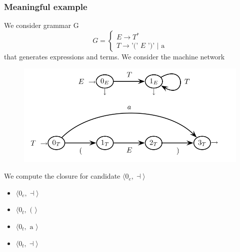 			\subsubsection{Meaningful example}
				We consider grammar G
				\begin{equation}
					G = 
					\begin{cases}
						E \rightarrow T^\ast\\
						T \rightarrow \text{'(' } E \text{ ')' } \vert \text{ a}
					\end{cases}
				\end{equation}
				that generates expressions and terms. We consider the machine network
				\begin{figure}[H]
					\begin{center}
						\includegraphics[width = \textwidth]{./images/exNetwork.png}
					\end{center}
				\end{figure}
				We compute the closure for candidate $\langle 0_e, \dashv \rangle$
				\begin{itemize}
					\item $\langle 0_e, \dashv \rangle$
					\item $\langle 0_t, \text{ ( }\rangle$
					\item $\langle 0_t, \text{ a }\rangle$
					\item $\langle 0_t, \dashv \rangle$
				\end{itemize}
		
